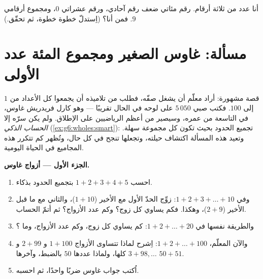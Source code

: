 \begin{exercise}[$\star\star\star$]\label{exo:g6:wholes:12}
أنا عدد من ثلاثة أرقام. رقم مئاتي ضعف رقم آحادي،
ورقم عشراتي $0$، ومجموع أرقامي $9$. فمن أنا؟
(اِستدلّ خطوة خطوة، ثم تحقّق.)
\end{exercise}

\section{مسألة: غاوس الصغير ومجموع المئة عدد
الأولى}

\begin{problem}
\label{pb:g6:wholes:1}
قصة مشهورة: أراد معلّم أن يشغل صفّه، فطلب من
تلاميذه أن يجمعوا كل الأعداد من $1$ إلى $100$. فكتب صبي
$5\,050$ على لوحه في الحال تقريبًا --- وهو كارل فريدريش غاوس، في
التاسعة من عمره، وسيصير من أعظم الرياضيين على
الإطلاق. ولم يكن سرّه إلا \emph{الحساب الذكي}
(\cref{ex:g6:wholes:smart}): تجميع الحدود بحيث تكون كل مجموعة
سهلة. وتعيد هذه المسألة اكتشاف حيلته، وتجعلها تنجح في كل
حال، وتُظهر كم تتكرر هذه المجاميع في الحياة اليومية.

\medskip
\noindent\textbf{الجزء الأول --- أزواج غاوس.}
\begin{enumerate}
  \item احسب $1 + 2 + 3 + 4 + 5$ بتجميع الحدود بذكاء.
  \item وفي $1 + 2 + 3 + \dots + 10$: زوِّج الحدّ الأول مع
        الأخير ($1 + 10$)، والثاني مع ما قبل الأخير
        ($2 + 9$)، وهكذا. فكم يساوي كل زوج؟ وكم عدد
        الأزواج؟ ثم أتمّ الحساب.
  \item والطريقة نفسها في $1 + 2 + \dots + 20$: كم يساوي كل زوج،
        وكم عدد الأزواج، وما ؟
  \item والآن  المعلّم، $1 + 2 + \dots + 100$: اِشرح
        لماذا تتساوى الأزواج $1 + 100$ و $2 + 99$ و $3 + 98, \dots$
        كلها، ولماذا عددها $50$ بالضبط،
        وآخرها $50 + 51$.
  \item اُكتب جواب غاوس ضربًا واحدًا، ثم
        احسبه.
\end{enumerate}


\end{problem}
